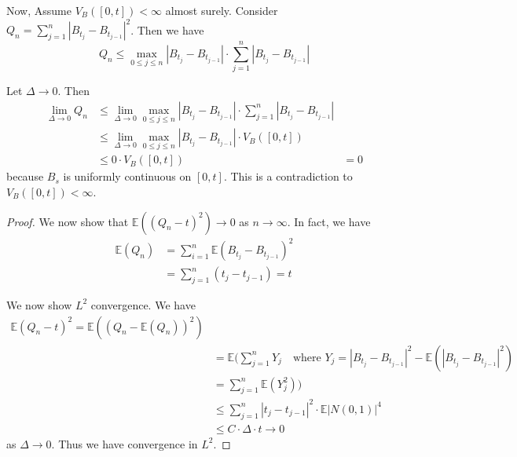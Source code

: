 \documentclass[10pt, oneside, reqno]{amsart}
\theoremstyle{plain}%
\theoremstyle{definition}
\theoremstyle{remark}
\newcommand{\E}{\mathbb{E}}
\begin{document}
Now, Assume $V_B([0,t]) < \infty$ almost surely.  Consider $Q_n = \sum_{j=1}^n | B_{t_j} - B_{t_{j-1}}  |^2$.  Then we have \[
    Q_n \leq \max_{ 0 \leq j \leq n} | B_{t_j} - B_{t_{j-1}} | \cdot \sum_{j=1}^n |B_{t_j} - B_{t_{j-1}} |
\]   

Let $\Delta \rightarrow 0$.  Then \begin{align*}
    \lim_{\Delta \rightarrow 0} Q_n &\leq  \lim_{ \Delta \rightarrow 0}\max_{ 0 \leq j \leq n} | B_{t_j} - B_{t_{j-1}} | \cdot \sum_{j=1}^n |B_{t_j} - B_{t_{j-1}} | \\
                                    &\leq \lim_{ \Delta \rightarrow 0}\max_{ 0 \leq j \leq n} | B_{t_j} - B_{t_{j-1}} | \cdot V_B([0,t]) \\
                                    &\leq 0 \cdot V_B([0,t])
                                    &= 0
\end{align*} because $B_s$ is uniformly continuous on $[0,t]$.  This is a contradiction to $V_B([0,t]) < \infty$.


\begin{proof}
    We now show that $\E((Q_n - t)^2) \rightarrow 0$ as $n \rightarrow \infty$.  In fact, we have
    \begin{align*}
        \E(Q_n) &= \sum_{i=1}^n \E(B_{t_j} - B_{t_{j-1}})^2 \\
                &= \sum_{j=1}^n (t_j - t_{j-1}) = t
    \end{align*}
    
    We now show $L^2$ convergence. We have \begin{align*}
        \E(Q_n - t)^2 = \E((Q_n - \E(Q_n))^2) \\
                    &= \E(\sum_{j=1}^n Y_j \quad \text{where $Y_j = |B_{t_j} - B_{t_{j-1}}|^2 - \E(|B_{t_j} - B_{t_{j-1}}|^2)$} \\
                    &= \sum_{j=1}^n \E(Y_j^2) ) \\
                    &\leq \sum_{j=1}^n | t_{j} - t_{j-1} |^2 \cdot \E | N(0,1) |^4 \\
                    &\leq C \cdot \Delta \cdot t \rightarrow 0
    \end{align*} as $\Delta \rightarrow 0$.  Thus we have convergence in $L^2$.  
\end{proof}


\end{document}
